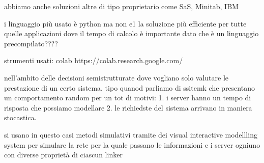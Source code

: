 abbiamo anche soluzioni altre di tipo proprietario come SaS, Minitab, IBM

i linguaggio più usato è python ma non e1 la soluzione più efficiente per tutte quelle applicazioni dove il tempo di calcolo è importante dato che è un linguaggio precompilato????


strumenti usati: colab https://colab.research.google.com/

nell'ambito delle decisioni semistrutturate dove vogliano solo valutare le prestazione di un certo sistema. tipo quanod parliamo di ssitemk che presentano un comportamento random per un tot di motivi: 1. i server hanno un tempo di risposta che possiamo modellare 2. le richiedste del sistema arrivano in maniera stocastica. 

si usano in questo casi metodi simulativi tramite dei visual interactive modellling system per simulare la rete per la quale passano le informazioni e i server ogniuno con diverse proprietà di ciascun linker 